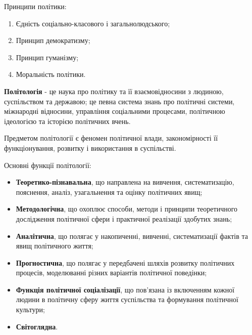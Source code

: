 Принципи політики:
\begin{enumerate}
\item Єдність соціально-класового і загальнолюдського;
\item Принцип демократизму;
\item Принцип гуманізму;
\item Моральність політики.
\end{enumerate}

{\bf Політологія} - це наука про політику та її взаємовідносини з людиною, суспільством та державою; це певна система знань про політичні системи, міжнародні відносини, управління соціальними процесами, політичною ідеологією та історією політичних вчень.

Предметом політології є феномен політичної влади, закономірності її функціонування, розвитку і використання в суспільстві.

Основні функції політології:
\begin{itemize}
\item {\bf Теоретико-пізнавальна}, що направлена на вивчення, систематизацію, пояснення, аналіз, узагальнення та оцінку політичних явищ;
\item {\bf Методологічна}, що охоплює способи, методи і принципи теоретичного дослідження політичної сфери і практичної реалізації здобутих знань;
\item {\bf Аналітична}, що полягає у накопиченні, вивченні, систематизації фактів та явищ політичного життя;
\item {\bf Прогностична}, що полягає у передбачені шляхів розвитку політичних процесів, моделюванні різних варіантів політичної поведінки;
\item {\bf Функція політичної соціалізації}, що пов’язана із включенням кожної людини в політичну сферу життя суспільства та формування політичної культури;
\item {\bf Світоглядна}.
\end{itemize}

